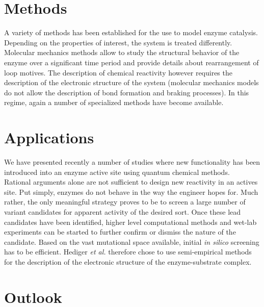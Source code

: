 \section{Methods}\label{sec:methods}
A variety of methods has been established for the use to model enzyme catalysis.
Depending on the properties of interest, the system is treated differently.
Molecular mechanics methods allow to study the structural behavior of the enzyme over a significant time period and provide details about rearrangement of loop motives.
The description of chemical reactivity however requires the description of the electronic structure of the system (molecular mechanics models do not allow the description of bond formation and braking processes).
In this regime, again a number of specialized methods have become available.




\section{Applications}\label{sec:apps}
We have presented recently a number of studies where new functionality has been introduced into an enzyme active site using quantum chemical methods\citep{10.1371/journal.pone.0049849,hediger2013silico,hediger2013computational}.\\
Rational arguments alone are not sufficient to design new reactivity in an actives site.
Put simply, enzymes do not behave in the way the engineer hopes for.
Much rather, the only meaningful strategy proves to be to screen a large number of variant candidates for apparent activity of the desired sort.
Once these lead candidates have been identified, higher level computational methods and wet-lab experiments can be started to further confirm or dismiss the nature of the candidate.
Based on the vast mutational space available, initial \textit{in silico} screening has to be efficient.
Hediger \textit{et al.} therefore chose to use semi-empirical methods for the description of the electronic structure of the enzyme-substrate complex.


\section{Outlook}\label{sec:out}
